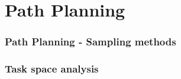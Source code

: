 \section{Path Planning}

\begin{frame}
\frametitle{Path Planning - Sampling methods}
\end{frame}

\begin{frame}
\frametitle{Task space analysis}
\end{frame}
